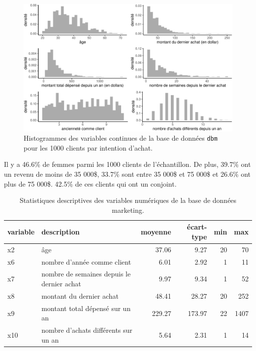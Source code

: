 \documentclass[
  11pt,
  letterpaper,
]{book}
\theoremstyle{definition}
\theoremstyle{remark}
\begin{document}
\begin{figure}[ht!]

{\centering \includegraphics[width=1\textwidth,height=\textheight]{./04-selectionmodeles_files/figure-pdf/fig-histogrammes-eda-dbm-1.pdf}

}

\caption{\label{fig-histogrammes-eda-dbm}Histogrammes des variables
continues de la base de données \texttt{dbm} pour les 1000 clients par
intention d'achat.}

\end{figure}

Il y a 46.6\% de femmes parmi les 1000 clients de l'échantillon. De
plus, 39.7\% ont un revenu de moins de 35 000\$, 33.7\% sont entre 35
000\$ et 75 000\$ et 26.6\% ont plus de 75 000\$. 42.5\% de ces clients
qui ont un conjoint.

\hypertarget{tbl-statdescript-dbm}{}
\begin{table}
\caption{\label{tbl-statdescript-dbm}Statistiques descriptives des variables numériques de la base de données
marketing. }\tabularnewline

\centering
\begin{tabular}{llrrrr}
\toprule
variable & description & moyenne & écart-type & min & max\\
\midrule
x2 & âge & 37.06 & 9.27 & 20 & 70\\
x6 & nombre d’année comme client & 6.01 & 2.92 & 1 & 11\\
x7 & nombre de semaines depuis le dernier achat & 9.97 & 9.34 & 1 & 52\\
x8 & montant du dernier achat & 48.41 & 28.27 & 20 & 252\\
x9 & montant total dépensé sur un an & 229.27 & 173.97 & 22 & 1407\\
x10 & nombre d'achats différents sur un an & 5.64 & 2.31 & 1 & 14\\
\bottomrule
\end{tabular}
\end{table}
\end{document}
